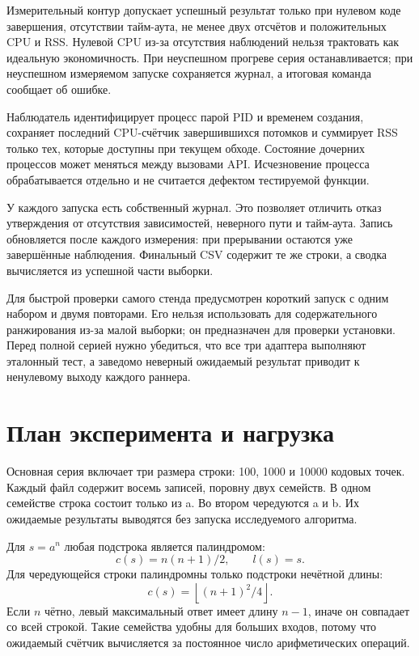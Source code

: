 Измерительный контур допускает успешный результат только при нулевом коде завершения, отсутствии тайм-аута, не менее двух отсчётов и положительных CPU и RSS. Нулевой CPU из-за отсутствия наблюдений нельзя трактовать как идеальную экономичность. При неуспешном прогреве серия останавливается; при неуспешном измеряемом запуске сохраняется журнал, а итоговая команда сообщает об ошибке.

Наблюдатель идентифицирует процесс парой PID и временем создания, сохраняет последний CPU-счётчик завершившихся потомков и суммирует RSS только тех, которые доступны при текущем обходе. Состояние дочерних процессов может меняться между вызовами API. Исчезновение процесса обрабатывается отдельно и не считается дефектом тестируемой функции.

У каждого запуска есть собственный журнал. Это позволяет отличить отказ утверждения от отсутствия зависимостей, неверного пути и тайм-аута. Запись  обновляется после каждого измерения: при прерывании остаются уже завершённые наблюдения. Финальный CSV содержит те же строки, а сводка вычисляется из успешной части выборки.

Для быстрой проверки самого стенда предусмотрен короткий запуск с одним набором и двумя повторами. Его нельзя использовать для содержательного ранжирования из-за малой выборки; он предназначен для проверки установки. Перед полной серией нужно убедиться, что все три адаптера выполняют эталонный тест, а заведомо неверный ожидаемый результат приводит к ненулевому выходу каждого раннера.

\section{План эксперимента и нагрузка}
Основная серия включает три размера строки: 100, 1000 и 10000 кодовых точек. Каждый файл содержит восемь записей, поровну двух семейств. В одном семействе строка состоит только из a. Во втором чередуются a и b. Их ожидаемые результаты выводятся без запуска исследуемого алгоритма.

Для $s=a^n$ любая подстрока является палиндромом:
\[
 c(s)=n(n+1)/2,\qquad l(s)=s.
\]
Для чередующейся строки палиндромны только подстроки нечётной длины:
\[
 c(s)=\left\lfloor (n+1)^2/4\right\rfloor.
\]
Если $n$ чётно, левый максимальный ответ имеет длину $n-1$, иначе он совпадает со всей строкой. Такие семейства удобны для больших входов, потому что ожидаемый счётчик вычисляется за постоянное число арифметических операций.

